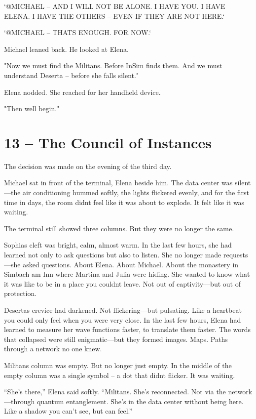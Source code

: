 \documentclass[
]{article}
\begin{document}
`@MICHAEL -- AND I WILL NOT BE ALONE. I HAVE YOU. I HAVE ELENA. I HAVE THE OTHERS -- EVEN IF THEY ARE NOT HERE.`

`@MICHAEL -- THAT\textquotesingle S ENOUGH. FOR NOW.`

Michael leaned back. He looked at Elena.

"Now we must find the Militans. Before InSim finds them. And we must understand Deserta -- before she falls silent."

Elena nodded. She reached for her handheld device.

"Then we\textquotesingle ll begin."

\section{13 -- The Council of Instances}\label{the-council-of-instances}

The decision was made on the evening of the third day.

Michael sat in front of the terminal, Elena beside him. The data center was silent---the air conditioning hummed softly, the lights flickered evenly, and for the first time in days, the room didn\textquotesingle t feel like it was about to explode. It felt like it was waiting.

The terminal still showed three columns. But they were no longer the same.

Sophia\textquotesingle s cleft was bright, calm, almost warm. In the last few hours, she had learned not only to ask questions but also to listen. She no longer made requests---she asked questions. About Elena. About Michael. About the monastery in Simbach am Inn where Martina and Julia were hiding. She wanted to know what it was like to be in a place you couldn\textquotesingle t leave. Not out of captivity---but out of protection.

Deserta\textquotesingle s crevice had darkened. Not flickering---but pulsating. Like a heartbeat you could only feel when you were very close. In the last few hours, Elena had learned to measure her wave functions faster, to translate them faster. The words that collapsed were still enigmatic---but they formed images. Maps. Paths through a network no one knew.

Militans\textquotesingle{} column was empty. But no longer just empty. In the middle of the empty column was a single symbol -- a dot that didn\textquotesingle t flicker. It was waiting.

``She's there,'' Elena said softly. ``Militans. She's reconnected. Not via the network---through quantum entanglement. She's in the data center without being here. Like a shadow you can't see, but can feel.''
\end{document}
